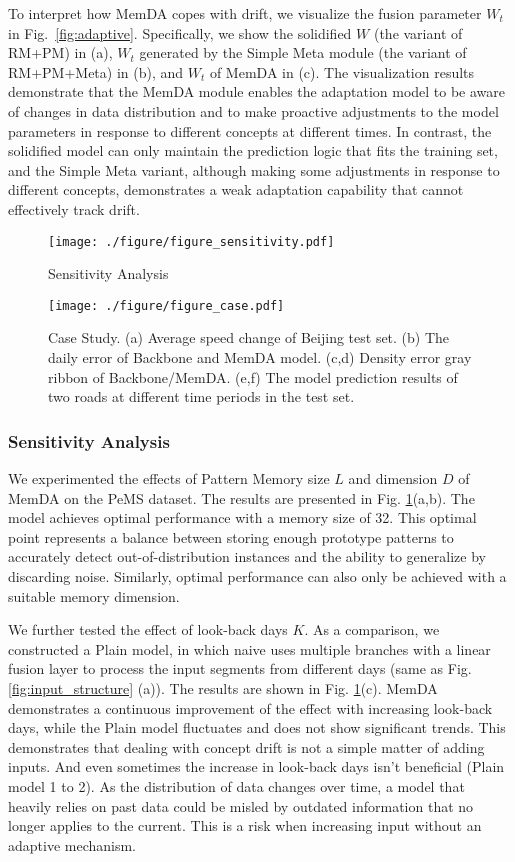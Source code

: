 \documentclass[sigconf]{acmart}
\begin{document}
To interpret how MemDA copes with drift, we visualize the fusion parameter $W_t$ in Fig.~\ref{fig:adaptive}. Specifically, we show the solidified $W$ (the variant of RM+PM) in (a), $W_t$ generated by the Simple Meta module (the variant of RM+PM+Meta) in (b), and $W_t$ of MemDA in (c). The visualization results demonstrate that the MemDA module enables the adaptation model to be aware of changes in data distribution and to make proactive adjustments to the model parameters in response to different concepts at different times. In contrast, the solidified model can only maintain the prediction logic that fits the training set, and the Simple Meta variant, although making some adjustments in response to different concepts, demonstrates a weak adaptation capability that cannot effectively track drift.

\begin{figure}[h]
	\centering
	\texttt{[image: ./figure/figure\_sensitivity.pdf]}
	\caption{Sensitivity Analysis}
	\label{fig:sensitivity}
\end{figure}

\begin{figure*}[h]
	\centering
	\texttt{[image: ./figure/figure\_case.pdf]}
	\caption{Case Study. (a) Average speed change of Beijing test set. (b) The daily error of Backbone and MemDA model. (c,d) Density error gray ribbon of Backbone/MemDA. (e,f) The model prediction results of two roads at different time periods in the test set.}
	\label{fig:case}
\end{figure*}

\subsubsection{Sensitivity Analysis}
We experimented the effects of Pattern Memory size $L$ and dimension $D$ of MemDA on the PeMS dataset. The results are presented in Fig. \ref{fig:sensitivity}(a,b). The model achieves optimal performance with a memory size of 32. This optimal point represents a balance between storing enough prototype patterns to accurately detect out-of-distribution instances and the ability to generalize by discarding noise. Similarly, optimal performance can also only be achieved with a suitable memory dimension.

We further tested the effect of look-back days $K$. As a comparison, we constructed a Plain model, in which naive uses multiple branches with a linear fusion layer to process the input segments from different days (same as Fig. \ref{fig:input_structure} (a)). The results are shown in Fig. \ref{fig:sensitivity}(c). MemDA demonstrates a continuous improvement of the effect with increasing look-back days, while the Plain model fluctuates and does not show significant trends. This demonstrates that dealing with concept drift is not a simple matter of adding inputs. And even sometimes the increase in look-back days isn't beneficial (Plain model 1 to 2). As the distribution of data changes over time, a model that heavily relies on past data could be misled by outdated information that no longer applies to the current. This is a risk when increasing input without an adaptive mechanism.
\end{document}
